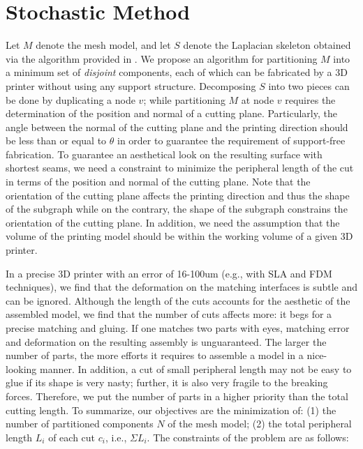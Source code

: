 \section{Stochastic Method}

Let $M$ denote the mesh model, and let $S$ denote the Laplacian skeleton obtained via the algorithm provided in \cite{AuTCCL08}. We propose an algorithm for partitioning $M$ into a minimum set of \emph{disjoint} components, each of which can be fabricated by a 3D printer without using any support structure. Decomposing $S$ into two pieces can be done by duplicating a node $v$; while partitioning $M$ at node $v$ requires the determination of the position and normal of a cutting plane. Particularly, the angle between the normal of the cutting plane and the printing direction should be less than or equal to $\theta$ in order to guarantee the requirement of support-free fabrication. To guarantee an aesthetical look on the resulting surface with shortest seams, we need a constraint to minimize the peripheral length of the cut in terms of the position and normal of the cutting plane. Note that the orientation of the cutting plane affects the printing direction and thus the shape of the subgraph while on the contrary, the shape of the subgraph constrains the orientation of the cutting plane. {In addition, we need the assumption that the volume of the printing model should be within the working volume of a given 3{D} printer.}

In a precise 3D printer with an error of 16-100um (e.g., with SLA and FDM techniques), we find that the deformation on the matching interfaces is subtle and can be ignored. Although the length of the cuts accounts for the aesthetic of the assembled model, we find that the number of cuts affects more: it begs for a precise matching and gluing. If one matches two parts with eyes, matching error and deformation on the resulting assembly is unguaranteed. The larger the number of parts, the more efforts it requires to assemble a model in a nice-looking manner. In addition, a cut of small peripheral length may not be easy to glue if its shape is very nasty; further, it is also very fragile to the breaking forces. Therefore, we put the number of parts in a higher priority than the total cutting length. To summarize, our objectives are the minimization of: (1) the number of partitioned components $N$ of the mesh model; (2) the total peripheral length $L_i$ of each cut $c_i$, i.e., $\Sigma L_i$. The constraints of the problem are as follows:

